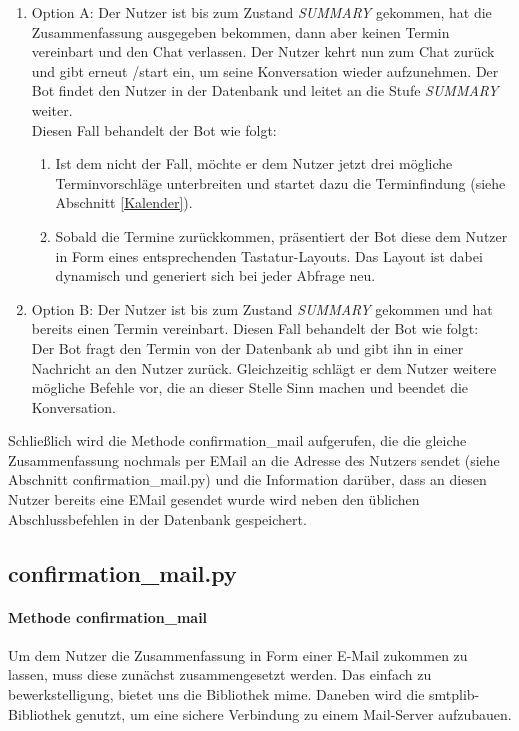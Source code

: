                 \begin{enumerate}
                \item Option A:  Der Nutzer ist bis zum Zustand \emph{SUMMARY} gekommen, hat die Zusammenfassung ausgegeben bekommen, dann aber keinen Termin vereinbart und den Chat verlassen. Der Nutzer kehrt nun zum Chat zurück und gibt erneut /start ein, um seine Konversation wieder aufzunehmen. Der Bot findet den Nutzer in der Datenbank und leitet an die Stufe \emph{SUMMARY} weiter. \\
                Diesen Fall behandelt der Bot wie folgt:
                    \begin{enumerate}
                        \item Ist dem nicht der Fall, möchte er dem Nutzer jetzt drei mögliche Terminvorschläge unterbreiten und startet dazu die Terminfindung (siehe Abschnitt \ref*{Kalender}). %
                        \item Sobald die Termine zurückkommen, präsentiert der Bot diese dem Nutzer in Form eines entsprechenden Tastatur-Layouts. Das Layout ist dabei dynamisch und generiert sich bei jeder Abfrage neu.
                    \end{enumerate}
                \item Option B: Der Nutzer ist bis zum Zustand \emph{SUMMARY} gekommen und hat bereits einen Termin vereinbart.
                Diesen Fall behandelt der Bot wie folgt:\\
                Der Bot fragt den Termin von der Datenbank ab und gibt ihn in einer Nachricht an den Nutzer zurück. Gleichzeitig schlägt er dem Nutzer weitere mögliche Befehle vor, die an dieser Stelle Sinn machen und beendet die Konversation.
                \end{enumerate}

            Schließlich wird die Methode confirmation\_mail aufgerufen, die die gleiche Zusammenfassung nochmals per E\-Mail an die Adresse des Nutzers sendet (siehe Abschnitt confirmation\_mail.py) und die Information darüber, dass an diesen Nutzer bereits eine E\-Mail gesendet wurde wird neben den üblichen Abschlussbefehlen in der Datenbank gespeichert.

                    
        \subsection{confirmation\_mail.py}
            \paragraph{Methode confirmation\_mail}
                Um dem Nutzer die Zusammenfassung in Form einer E-Mail zukommen zu lassen, muss diese zunächst zusammengesetzt werden. Das einfach zu bewerkstelligung, bietet uns die Bibliothek mime. \cite{mime} Daneben wird die smtplib-Bibliothek genutzt, um eine sichere Verbindung zu einem Mail-Server aufzubauen. \cite{smtplib}\\

